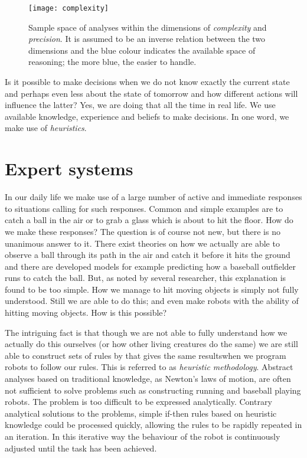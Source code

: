 \documentclass[11pt,fleqn]{book} %
\begin{document}
\begin{figure}[ht]
\centering
\texttt{[image: complexity]}
\caption{Sample space of analyses within the dimensions of \textit{complexity} and \textit{precision}. It is assumed to be an inverse relation between the two dimensions and the blue colour indicates the available space of reasoning; the more blue, the easier to handle.}
\label{fig:complexity}
\end{figure}

Is it possible to make decisions when we do not know exactly the current state and perhaps even less about the state of tomorrow and how different actions will influence the latter? Yes, we are doing that all the time in real life. We use available knowledge, experience and beliefs to make decisions. In one word, we make use of \textit{heuristics}.

\section{Expert systems}

In our daily life we make use of a large number of active and immediate responses to situations calling for such responses. Common and simple examples are to catch a ball in the air or to grab a glass which is about to hit the floor. How do we make these responses? The question is of course not new, but there is no unanimous answer to it. There exist theories on how we actually are able to observe a ball through its path in the air and catch it before it hits the ground\cite{McBeath1995} and there are developed models for example predicting how a baseball outfielder runs to catch the ball. But, as noted by several researcher, this explanation is found to be too simple\cite{Brouwer2000}. How we manage to hit moving objects is simply not fully understood. Still we are able to do this; and even make robots with the ability of hitting moving objects\cite{Belkhouche2005}. How is this possible?

The intriguing fact is that though we are not able to fully understand how we actually do this ourselves (or how other living creatures do the same) we are still able to construct sets of rules by that gives the same resultswhen we program robots to follow our rules. This is referred to as \textit{heuristic methodology}. Abstract analyses based on traditional knowledge, as Newton's laws of motion, are often not sufficient to solve problems such as constructing running and baseball playing robots. The problem is too difficult to be expressed analytically. Contrary analytical solutions to the problems, simple if-then rules based on heuristic knowledge could be processed quickly, allowing the rules to be rapidly repeated in an iteration. In this iterative way the behaviour of the robot is continuously adjusted until the task has been achieved.
\end{document}
